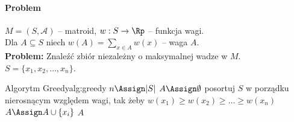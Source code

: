 \paragraph{Problem}
$M = (S, \mathcal{A})$ -- matroid, $w: S \to \Rp$ -- funkcja wagi.\\
Dla $A \subseteq S$ niech $w(A) = \sum_{x \in A} w(x)$ -- waga $A$.\\
\textbf{Problem:} Znaleźć zbiór niezależny o maksymalnej wadze w $M$.\\
$S = \{x_1, x_2, \ldots, x_n\}$.

\begin{alg}{Algorytm Greedy}{alg:greedy}
	\State $n \Assign |S|$
	\State $A \Assign \emptyset$ 
	\State posortuj $S$ w porządku nierosnącym względem wagi, tak żeby $w(x_1) \geq w(x_2) \geq \ldots \geq w(x_n)$
	\State $A \Assign A \cup \{x_i\}$
	\EndIf
	\EndFor
	\State \Return $A$
	\EndFunction
\end{alg}

